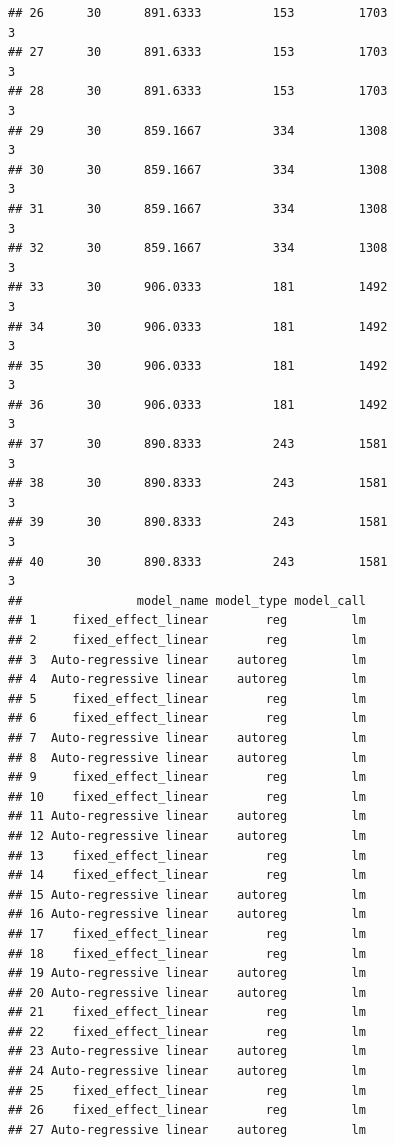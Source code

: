 \documentclass[
]{article}
\begin{document}
\begin{verbatim}
## 26      30      891.6333          153         1703                        3
## 27      30      891.6333          153         1703                        3
## 28      30      891.6333          153         1703                        3
## 29      30      859.1667          334         1308                        3
## 30      30      859.1667          334         1308                        3
## 31      30      859.1667          334         1308                        3
## 32      30      859.1667          334         1308                        3
## 33      30      906.0333          181         1492                        3
## 34      30      906.0333          181         1492                        3
## 35      30      906.0333          181         1492                        3
## 36      30      906.0333          181         1492                        3
## 37      30      890.8333          243         1581                        3
## 38      30      890.8333          243         1581                        3
## 39      30      890.8333          243         1581                        3
## 40      30      890.8333          243         1581                        3
##                model_name model_type model_call
## 1     fixed_effect_linear        reg         lm
## 2     fixed_effect_linear        reg         lm
## 3  Auto-regressive linear    autoreg         lm
## 4  Auto-regressive linear    autoreg         lm
## 5     fixed_effect_linear        reg         lm
## 6     fixed_effect_linear        reg         lm
## 7  Auto-regressive linear    autoreg         lm
## 8  Auto-regressive linear    autoreg         lm
## 9     fixed_effect_linear        reg         lm
## 10    fixed_effect_linear        reg         lm
## 11 Auto-regressive linear    autoreg         lm
## 12 Auto-regressive linear    autoreg         lm
## 13    fixed_effect_linear        reg         lm
## 14    fixed_effect_linear        reg         lm
## 15 Auto-regressive linear    autoreg         lm
## 16 Auto-regressive linear    autoreg         lm
## 17    fixed_effect_linear        reg         lm
## 18    fixed_effect_linear        reg         lm
## 19 Auto-regressive linear    autoreg         lm
## 20 Auto-regressive linear    autoreg         lm
## 21    fixed_effect_linear        reg         lm
## 22    fixed_effect_linear        reg         lm
## 23 Auto-regressive linear    autoreg         lm
## 24 Auto-regressive linear    autoreg         lm
## 25    fixed_effect_linear        reg         lm
## 26    fixed_effect_linear        reg         lm
## 27 Auto-regressive linear    autoreg         lm

\end{verbatim}
\end{document}
